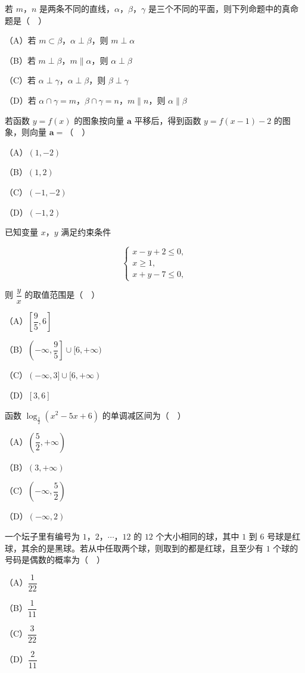 \begin{question}
若 $m$，$n$ 是两条不同的直线，$\alpha$，$\beta$，$\gamma$ 是三个不同的平面，则下列命题中的真命题是（　）

（A）若 $m\subset\beta$，$\alpha\perp\beta$，则 $m\perp\alpha$

（B）若 $m\perp\beta$，$m\parallel\alpha$，则 $\alpha\perp\beta$

（C）若 $\alpha\perp\gamma$，$\alpha\perp\beta$，则 $\beta\perp\gamma$

（D）若 $\alpha\cap\gamma=m$，$\beta\cap\gamma=n$，$m\parallel n$，则 $\alpha\parallel\beta$

\end{question}
\begin{question}
若函数 $y=f(x)$ 的图象按向量 $\boldsymbol a$ 平移后，得到函数 $y=f(x-1)-2$ 的图象，则向量 $\boldsymbol a=$（　）

（A）$(1,-2)$

（B）$(1,2)$

（C）$(-1,-2)$

（D）$(-1,2)$

\end{question}
\begin{question}
已知变量 $x$，$y$ 满足约束条件

\nopagebreak[4]
\[\begin{cases}x-y+2\leqslant0,\\ x\geqslant1,\\ x+y-7\leqslant0,\end{cases}\]

则 $\dfrac yx$ 的取值范围是（　）

（A）$\left[\dfrac95,6\right]$

（B）$\left(-\infty,\dfrac95\right]\cup[6,+\infty)$

（C）$(-\infty,3]\cup[6,+\infty)$

（D）$[3,6]$

\end{question}
\begin{question}
函数 $\log_{\frac12}(x^2-5x+6)$ 的单调减区间为（　）

（A）$\left(\dfrac52,+\infty\right)$

（B）$(3,+\infty)$

（C）$\left(-\infty,\dfrac52\right)$

（D）$(-\infty,2)$

\end{question}
\begin{question}
一个坛子里有编号为 $1$，$2$，$\cdots$，$12$ 的 $12$ 个大小相同的球，其中 $1$ 到 $6$ 号球是红球，其余的是黑球。若从中任取两个球，则取到的都是红球，且至少有 $1$ 个球的号码是偶数的概率为（　）

（A）$\dfrac1{22}$

（B）$\dfrac1{11}$

（C）$\dfrac3{22}$

（D）$\dfrac2{11}$

\end{question}
